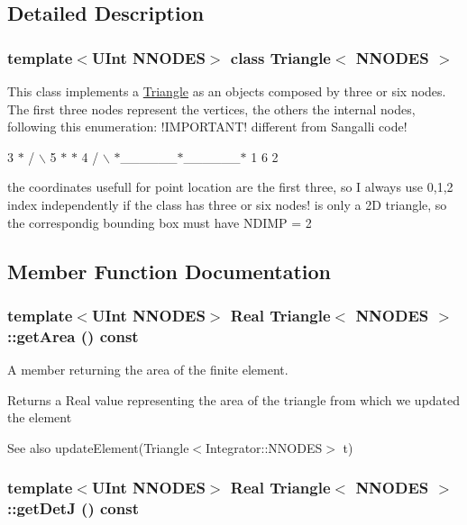 \subsection{Detailed Description}
\subsubsection*{template$<$UInt NNODES$>$ class Triangle$<$ NNODES $>$}

This class implements a \hyperlink{classTriangle}{Triangle} as an objects composed by three or six nodes. The first three nodes represent the vertices, the others the internal nodes, following this enumeration: !IMPORTANT! different from Sangalli code!

3 $\ast$ / $\backslash$ 5 $\ast$ $\ast$ 4 / $\backslash$ $\ast$\_\-\_\-\_\-\_\-\_\-\_\-$\ast$\_\-\_\-\_\-\_\-\_\-\_\-$\ast$ 1 6 2

the coordinates usefull for point location are the first three, so I always use 0,1,2 index independently if the class has three or six nodes! is only a 2D triangle, so the correspondig bounding box must have NDIMP = 2 

\subsection{Member Function Documentation}
\hypertarget{classTriangle_a319c68c604089e6de23459d8c6d52f8a}{
\subsubsection[{getArea}]{\setlength{\rightskip}{0pt plus 5cm}template$<$UInt NNODES$>$ Real {\bf Triangle}$<$ NNODES $>$::getArea () const}}
\label{classTriangle_a319c68c604089e6de23459d8c6d52f8a}


A member returning the area of the finite element. \begin{DoxyReturn}{Returns}
a Real value representing the area of the triangle from which we updated the element 
\end{DoxyReturn}
\begin{DoxySeeAlso}{See also}
updateElement(Triangle$<$Integrator::NNODES$>$ t) 
\end{DoxySeeAlso}
\hypertarget{classTriangle_afd08dcbf5895b0c7cba20f296d40c068}{
\subsubsection[{getDetJ}]{\setlength{\rightskip}{0pt plus 5cm}template$<$UInt NNODES$>$ Real {\bf Triangle}$<$ NNODES $>$::getDetJ () const}}
\label{classTriangle_afd08dcbf5895b0c7cba20f296d40c068}


